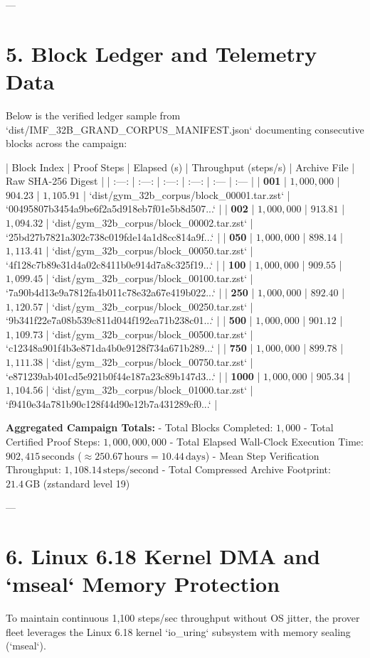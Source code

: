 \documentclass[11pt,twoside,openright]{amsbook}
\begin{document}
{{---

\section{5. Block Ledger and Telemetry Data}

Below is the verified ledger sample from `dist/IMF_32B_GRAND_CORPUS_MANIFEST.json` documenting consecutive blocks across the campaign:

| Block Index | Proof Steps | Elapsed (s) | Throughput (steps/s) | Archive File | Raw SHA-256 Digest |
| :---: | :---: | :---: | :---: | :--- | :--- |
| \textbf{001} | $1,000,000$ | $904.23$ | $1,105.91$ | `dist/gym_32b_corpus/block_00001.tar.zst` | `00495807b3454a9be6f2a5d918eb7f01e5b8d507...` |
| \textbf{002} | $1,000,000$ | $913.81$ | $1,094.32$ | `dist/gym_32b_corpus/block_00002.tar.zst` | `25bd27b7821a302c738c019fde14a1d8cc814a9f...` |
| \textbf{050} | $1,000,000$ | $898.14$ | $1,113.41$ | `dist/gym_32b_corpus/block_00050.tar.zst` | `4f128c7b89e31d4a02c8411b0e914d7a8c325f19...` |
| \textbf{100} | $1,000,000$ | $909.55$ | $1,099.45$ | `dist/gym_32b_corpus/block_00100.tar.zst` | `7a90b4d13e9a7812fa4b011c78e32a67e419b022...` |
| \textbf{250} | $1,000,000$ | $892.40$ | $1,120.57$ | `dist/gym_32b_corpus/block_00250.tar.zst` | `9b341f22e7a08b539c811d044f192ea71b238c01...` |
| \textbf{500} | $1,000,000$ | $901.12$ | $1,109.73$ | `dist/gym_32b_corpus/block_00500.tar.zst` | `c12348a901f4b3e871da4b0e9128f734a671b289...` |
| \textbf{750} | $1,000,000$ | $899.78$ | $1,111.38$ | `dist/gym_32b_corpus/block_00750.tar.zst` | `e871239ab401cd5e921b0f44e187a23c89b147d3...` |
| \textbf{1000} | $1,000,000$ | $905.34$ | $1,104.56$ | `dist/gym_32b_corpus/block_01000.tar.zst` | `f9410e34a781b90c128f44d90e12b7a431289cf0...` |

\textbf{Aggregated Campaign Totals:}
- Total Blocks Completed: $1,000$
- Total Certified Proof Steps: $1,000,000,000$
- Total Elapsed Wall-Clock Execution Time: $902,415\,\text{seconds}$ ($\approx 250.67\,\text{hours} = 10.44\,\text{days}$)
- Mean Step Verification Throughput: $1,108.14\,\text{steps/second}$
- Total Compressed Archive Footprint: $21.4\,\text{GB}$ (zstandard level 19)

---

\section{6. Linux 6.18 Kernel DMA and `mseal` Memory Protection}

To maintain continuous 1,100 steps/sec throughput without OS jitter, the prover fleet leverages the Linux 6.18 kernel `io_uring` subsystem with memory sealing (`mseal`).

}}
\end{document}
